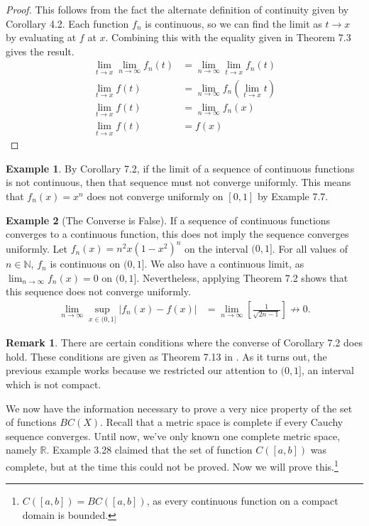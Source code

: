 \documentclass{article}
\newcommand{\N}{\mathbb{N}}
\newcommand{\R}{\mathbb{R}}
\theoremstyle{definition}
\newtheorem{example}{Example}[section]
\newtheorem{remark}{Remark}[section]
\begin{document}
	\begin{proof}
		This follows from the fact the alternate definition of continuity given by Corollary 4.2. Each function $ f_n $ is continuous, so we can find the limit as $ t\to x $ by evaluating at $ f $ at $ x $. Combining this with the equality given in Theorem 7.3 gives the result. 
		\begin{align*}
			\lim\limits_{t\to x}\lim\limits_{n\to\infty}f_n(t)&=\lim\limits_{n\to\infty} \lim\limits_{t\to x}f_n(t)\\ 	\lim\limits_{t\to x}f(t)&=\lim\limits_{n\to\infty}f_n\left( \lim\limits_{t\to x} t\right)\\
			\lim\limits_{t\to x}f(t)&=\lim\limits_{n\to\infty}f_n\left(x\right)\\
			\lim\limits_{t\to x}f(t)&=f\left(x\right)
		\end{align*}
	\end{proof}
	\begin{example}
		By Corollary 7.2, if the limit of a sequence of continuous functions is not continuous, then that sequence must not converge uniformly. This means that $ f_n(x)=x^n $ does not converge uniformly on $ [0,1] $ by Example 7.7.
	\end{example}
	\begin{example}[The Converse is False]
		If a sequence of continuous functions converges to a continuous function, this does not imply the sequence converges uniformly. Let $ f_n(x)=n^2x(1-x^2)^n $ on the interval $ (0,1] $. For all values of $ n\in\N $, $ f_n $ is continuous on $ (0,1] $. We also have a continuous limit, as $ \lim_{n\to\infty}f_n(x)=0 $ on $ (0,1] $. Nevertheless, applying Theorem 7.2 shows that this sequence does not converge uniformly. 
		\begin{align*}
			\lim\limits_{n\to\infty}\sup_{x\in (0,1]}|f_n(x)-f(x)|&=\lim\limits_{n\to\infty}\left[\frac{1}{\sqrt{2n-1}}\right]\not\to 0.
		\end{align*}
		\begin{remark}
			There are certain conditions where the converse of Corollary 7.2 does hold. These conditions are given as Theorem 7.13 in \cite{rudin1964principles}. As it turns out, the previous example works because we restricted our attention to $ (0,1] $, an interval which is not compact. 
		\end{remark}
		
		We now have the information necessary to prove a very nice property of the set of functions $ BC(X) $. Recall that a metric space is complete if every Cauchy sequence converges. Until now, we've only known one complete metric space, namely $ \R $. Example 3.28 claimed that the set of function $ C([a,b]) $ was complete, but at the time this could not be proved. Now we will prove this.\footnote{$ C([a,b])=BC([a,b]) $, as every continuous function on a compact domain is bounded.}
	\end{example}
\end{document}
